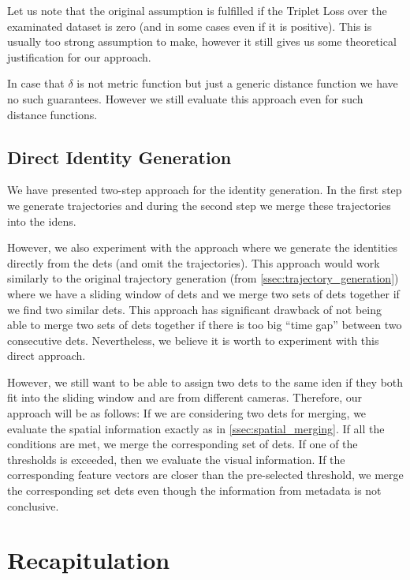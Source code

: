 Let us note that the original assumption is fulfilled if the Triplet Loss
over the examinated dataset is zero (and in some cases even if it is positive).
This is usually too strong assumption to make, however it still gives us some
theoretical justification for our approach.

In case that $\delta$ is not metric function but just a generic distance
function we have no such guarantees. However we still evaluate this approach
even for such distance functions.

\subsection{Direct Identity Generation}

We have presented two-step approach for the identity generation. In the first step we generate
trajectories and during the second step we merge these trajectories into
the \glspl{iden}.

However, we also experiment with the approach where we generate the identities directly from the \glspl{det} (and omit the trajectories). This approach would work similarly to the original trajectory generation (from \autoref{ssec:trajectory_generation}) where we have a sliding window of \glspl{det} and we merge two sets of \glspl{det} together if we find two similar \glspl{det}. This approach has significant drawback of not being able to merge two sets of \glspl{det} together if there is too big ``time gap'' between two consecutive \glspl{det}. Nevertheless, we believe it is worth to experiment with this direct approach.

However, we still want to be able to assign two \glspl{det} to the
same \gls{iden} if they both fit into the sliding window and are from different cameras. Therefore, our approach will be as follows: If we are
considering two \glspl{det} for merging, we evaluate the spatial information
exactly as in \autoref{ssec:spatial_merging}. If all the conditions are met,
we merge the corresponding set of \glspl{det}. If one of the thresholds is
exceeded, then we evaluate the visual information. If the corresponding feature
vectors are closer than the pre-selected threshold, we merge the corresponding set \glspl{det} even though the information from metadata is not conclusive.

\section{Recapitulation}

